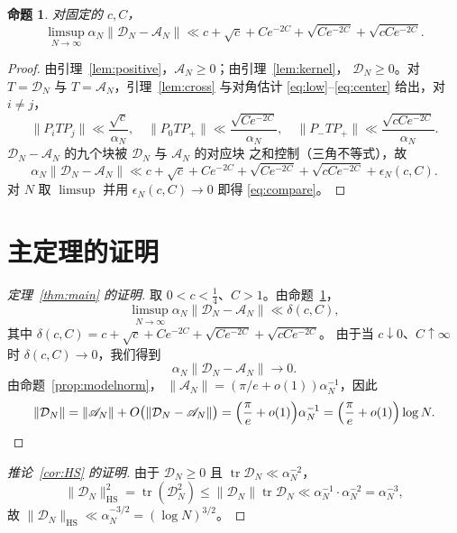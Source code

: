 \documentclass[12pt,a4paper]{amsart}
\numberwithin{equation}{section}
\theoremstyle{plain}
\newtheorem{proposition}[theorem]{命题}
\theoremstyle{definition}
\newcommand{\HS}{\mathrm{HS}}
\begin{document}
\begin{proposition}\label{prop:compare}
对固定的 $c,C$，
\begin{equation}\label{eq:compare}
 \limsup_{N\to\infty}\alpha_N\|\mathcal D_N-\mathscr A_N\|
 \ll c+\sqrt c+Ce^{-2C}+\sqrt{Ce^{-2C}}+\sqrt{cCe^{-2C}} .
\end{equation}
\end{proposition}

\begin{proof}
由引理~\ref{lem:positive}，$\mathscr A_N\ge0$；由引理~\ref{lem:kernel}，
$\mathcal D_N\ge0$。对 $T=\mathcal D_N$ 与 $T=\mathscr A_N$，引理~\ref{lem:cross}
与对角估计 \eqref{eq:low}--\eqref{eq:center} 给出，对 $i\ne j$，
\[
 \|P_iTP_j\|\ll\frac{\sqrt{c}}{\alpha_N},\quad
 \|P_0TP_+\|\ll\frac{\sqrt{Ce^{-2C}}}{\alpha_N},\quad
 \|P_-TP_+\|\ll\frac{\sqrt{cCe^{-2C}}}{\alpha_N} .
\]
$\mathcal D_N-\mathscr A_N$ 的九个块被 $\mathcal D_N$ 与 $\mathscr A_N$ 的对应块
之和控制（三角不等式），故
\[
 \alpha_N\|\mathcal D_N-\mathscr A_N\|
 \ll c+\sqrt c+Ce^{-2C}+\sqrt{Ce^{-2C}}+\sqrt{cCe^{-2C}}+\epsilon_N(c,C).
\]
对 $N$ 取 $\limsup$ 并用 $\epsilon_N(c,C)\to0$ 即得 \eqref{eq:compare}。
\end{proof}

\section{主定理的证明}\label{sec:proof}

\begin{proof}[定理~\ref{thm:main} 的证明]
取 $0<c<\frac14$、$C>1$。由命题~\ref{prop:compare}，
\[
 \limsup_{N\to\infty}\alpha_N\|\mathcal D_N-\mathscr A_N\|\ll\delta(c,C),
\]
其中 $\delta(c,C)=c+\sqrt c+Ce^{-2C}+\sqrt{Ce^{-2C}}+\sqrt{cCe^{-2C}}$。
由于当 $c\downarrow0$、$C\uparrow\infty$ 时 $\delta(c,C)\to0$，我们得到
\[
 \alpha_N\|\mathcal D_N-\mathscr A_N\|\longrightarrow0 .
\]
由命题~\ref{prop:modelnorm}，
$\|\mathscr A_N\|=(\pi/e+o(1))\alpha_N^{-1}$，因此
\[
 \|\mathcal D_N\|=\|\mathscr A_N\|+O\bigl(\|\mathcal D_N-\mathscr A_N\|\bigr)
 =\Bigl(\frac{\pi}{e}+o(1)\Bigr)\alpha_N^{-1}
 =\Bigl(\frac{\pi}{e}+o(1)\Bigr)\log N .
\]
\end{proof}

\begin{proof}[推论~\ref{cor:HS} 的证明]
由于 $\mathcal D_N\ge0$ 且 $\operatorname{tr}\mathcal D_N\ll\alpha_N^{-2}$，
\[
 \|\mathcal D_N\|_{\HS}^2=\operatorname{tr}(\mathcal D_N^2)
 \le\|\mathcal D_N\|\operatorname{tr}\mathcal D_N
 \ll\alpha_N^{-1}\cdot\alpha_N^{-2}=\alpha_N^{-3},
\]
故 $\|\mathcal D_N\|_{\HS}\ll\alpha_N^{-3/2}=(\log N)^{3/2}$。
\end{proof}
\end{document}

